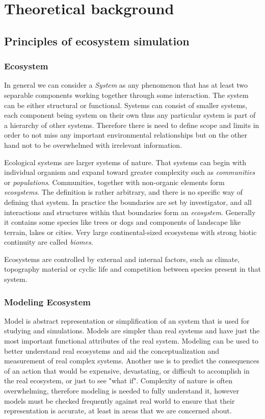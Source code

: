 \chapter{Theoretical background}
\section{Principles of ecosystem simulation}
\subsection{Ecosystem}
In general we can consider a \emph{System} as any phenomenon that has at least two separable components working together through some interaction. The system can be either structural or functional. Systems can consist of smaller systems, each component being system on their own thus any particular system is part of a hierarchy of other systems. Therefore there is need to define scope and limits in order to not miss any important environmental relationships but on the other hand not to be overwhelmed with irrelevant information. 

Ecological systems are larger systems of nature. That systems can begin with individual organism and expand toward greater complexity such as \emph{communities} or \emph{populations}. Communities, together with non-organic elements form \emph{ecosystems}. The definition is rather arbitrary, and there is no specific way of defining that system. In practice the boundaries are set by investigator, and all interactions and structures within that boundaries form an \emph{ecosystem}. Generally it contains some species like trees or dogs and components of landscape like terrain, lakes or cities. Very large continental-sized ecosystems with strong biotic continuity are called \emph{biomes}. 

Ecosystems are controlled by external and internal factors, such as climate, topography material or cyclic life and competition between species present in that system.
\cite{Hall_Day_1977}

\subsection{Modeling Ecosystem}
\label{modeling_ecosystem}
Model is abstract representation or simplification of an system that is used for studying and simulations. Models are simpler than real systems and have just the most important functional attributes of the real system. Modeling can be used to better understand real ecosystems and aid the conceptualization and measurement of real complex systems. Another use is to predict the consequences of an action that would be expensive, devastating, or difficult to accomplish in the real ecosystem, or just to see "what if". Complexity of nature is often overwhelming, therefore modeling is needed to fully understand it, however models must be checked frequently against real world to ensure that their representation is accurate, at least in areas that we are concerned about.

